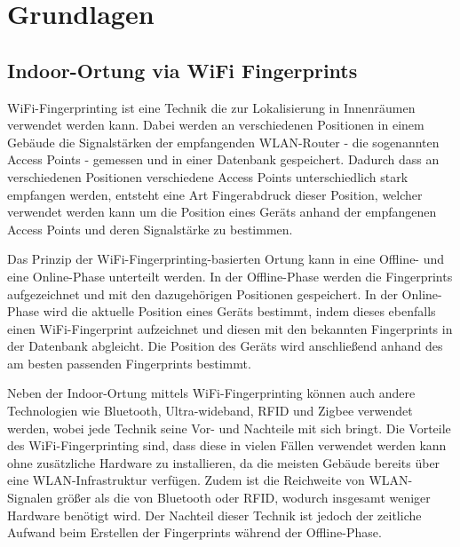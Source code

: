 \chapter{Grundlagen}




\section{Indoor-Ortung via WiFi Fingerprints}

WiFi-Fingerprinting ist eine Technik die zur Lokalisierung in Innenräumen verwendet werden kann. Dabei werden an verschiedenen Positionen in einem Gebäude die Signalstärken der empfangenden WLAN-Router - die sogenannten Access Points - gemessen und in einer Datenbank gespeichert. Dadurch dass an verschiedenen Positionen verschiedene Access Points unterschiedlich stark empfangen werden, entsteht eine Art Fingerabdruck dieser Position, welcher verwendet werden kann um die Position eines Geräts anhand der empfangenen Access Points und deren Signalstärke zu bestimmen.

Das Prinzip der WiFi-Fingerprinting-basierten Ortung kann in eine Offline- und eine Online-Phase unterteilt werden. In der Offline-Phase werden die Fingerprints aufgezeichnet und mit den dazugehörigen Positionen gespeichert. In der Online-Phase wird die aktuelle Position eines Geräts bestimmt, indem dieses ebenfalls einen WiFi-Fingerprint aufzeichnet und diesen mit den bekannten Fingerprints in der Datenbank abgleicht. Die Position des Geräts wird anschließend anhand des am besten passenden Fingerprints bestimmt. 

Neben der Indoor-Ortung mittels WiFi-Fingerprinting können auch andere Technologien wie Bluetooth, Ultra-wideband, RFID und Zigbee verwendet werden, wobei jede Technik seine Vor- und Nachteile mit sich bringt. Die Vorteile des WiFi-Fingerprinting sind, dass diese in vielen Fällen verwendet werden kann ohne zusätzliche Hardware zu installieren, da die meisten Gebäude bereits über eine WLAN-Infrastruktur verfügen. Zudem ist die Reichweite von WLAN-Signalen größer als die von Bluetooth oder RFID, wodurch insgesamt weniger Hardware benötigt wird. Der Nachteil dieser Technik ist jedoch der zeitliche Aufwand beim Erstellen der Fingerprints während der Offline-Phase.

